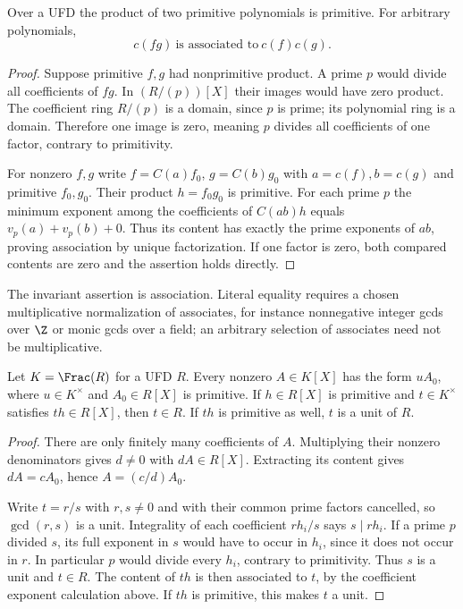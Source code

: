 \begin{theorem}\label{thm:gauss-content}
Over a UFD the product of two primitive polynomials is primitive.
For arbitrary polynomials,
\[
 c(fg)\ \text{is associated to}\ c(f)c(g).
\]
\end{theorem}
\begin{proof}
Suppose primitive $f,g$ had nonprimitive product. A prime $p$ would
divide all coefficients of $fg$. In $(R/(p))[X]$ their images would
have zero product. The coefficient ring $R/(p)$ is a domain, since
$p$ is prime; its polynomial ring is a domain. Therefore one image
is zero, meaning $p$ divides all coefficients of one factor,
contrary to primitivity.

For nonzero $f,g$ write $f=C(a)f_0$, $g=C(b)g_0$ with
$a=c(f),b=c(g)$ and primitive $f_0,g_0$. Their product $h=f_0g_0$
is primitive. For each prime $p$ the minimum exponent among the
coefficients of $C(ab)h$ equals
$v_p(a)+v_p(b)+0$. Thus its content has exactly the prime
exponents of $ab$, proving association by unique factorization.
If one factor is zero, both compared contents are zero and the
assertion holds directly.
\end{proof}
The invariant assertion is association. Literal equality requires a
chosen multiplicative normalization of associates, for instance
nonnegative integer gcds over $\Z$ or monic gcds over a field;
an arbitrary selection of associates need not be multiplicative.

\begin{lemma}\label{lem:primitive-scalar}
Let $K=\Frac(R)$ for a UFD $R$. Every nonzero $A\in K[X]$ has
the form $uA_0$, where $u\in K^\times$ and $A_0\in R[X]$ is
primitive. If $h\in R[X]$ is primitive and $t\in K^\times$
satisfies $th\in R[X]$, then $t\in R$. If $th$ is primitive
as well, $t$ is a unit of $R$.
\end{lemma}
\begin{proof}
There are only finitely many coefficients of $A$. Multiplying their
nonzero denominators gives $d\ne0$ with $dA\in R[X]$.
Extracting its content gives $dA=cA_0$, hence $A=(c/d)A_0$.

Write $t=r/s$ with $r,s\ne0$ and with their common prime factors
cancelled, so $\gcd(r,s)$ is a unit. Integrality of each coefficient
$r h_i/s$ says $s\mid rh_i$. If a prime $p$ divided $s$, its
full exponent in $s$ would have to occur in $h_i$, since it does
not occur in $r$. In particular $p$ would divide every $h_i$,
contrary to primitivity. Thus $s$ is a unit and $t\in R$.
The content of $th$ is then associated to $t$, by the coefficient
exponent calculation above. If $th$ is primitive, this makes $t$
a unit.
\end{proof}

